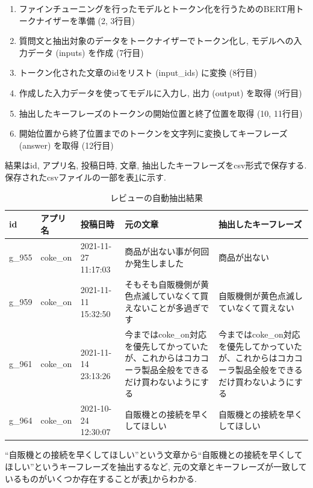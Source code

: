 \begin{enumerate}
  \item ファインチューニングを行ったモデルとトークン化を行うためのBERT用トークナイザーを準備 (2, 3行目)
  \item 質問文と抽出対象のデータをトークナイザーでトークン化し, モデルへの入力データ (inputs) を作成 (7行目)
  \item トークン化された文章のidをリスト (input\_ids) に変換 (8行目)
  \item 作成した入力データを使ってモデルに入力し, 出力 (output) を取得 (9行目)
  \item 抽出したキーフレーズのトークンの開始位置と終了位置を取得 (10, 11行目)
  \item 開始位置から終了位置までのトークンを文字列に変換してキーフレーズ (answer) を取得 (12行目)
\end{enumerate}
結果はid, アプリ名, 投稿日時, 文章, 抽出したキーフレーズをcsv形式で保存する. 保存されたcsvファイルの一部を表\ref{tb:googleqa}に示す. 

\begin{table}[H]
  \caption{レビューの自動抽出結果}
  \label{tb:googleqa}
  \small
  \begin{center}
  \begin{tabularx}{\linewidth}{l|l|X|X|X}
    \hline
    id&アプリ名&投稿日時&元の文章&抽出したキーフレーズ\\\hline\hline
    g\_955&coke\_on&2021-11-27 11:17:03&商品が出ない事が何回か発生しました&商品が出ない\\\hline
    g\_959&coke\_on&2021-11-11 15:32:50&そもそも自販機側が黄色点滅していなくて買えないことが多過ぎです&自販機側が黄色点滅していなくて買えない\\\hline
    g\_961&coke\_on&2021-11-14 23:13:26&今まではcoke\_on対応を優先してかっていたが、これからはコカコーラ製品全般をできるだけ買わないようにする&今まではcoke\_on対応を優先してかっていたが、これからはコカコーラ製品全般をできるだけ買わないようにする\\\hline
    g\_964&coke\_on&2021-10-24 12:30:07&自販機との接続を早くしてほしい&自販機との接続を早くしてほしい\\\hline
  \end{tabularx}\end{center}
\end{table}

``自販機との接続を早くしてほしい''という文章から``自販機との接続を早くしてほしい''というキーフレーズを抽出するなど, 元の文章とキーフレーズが一致しているものがいくつか存在することが表\ref{tb:googleqa}からわかる. 

